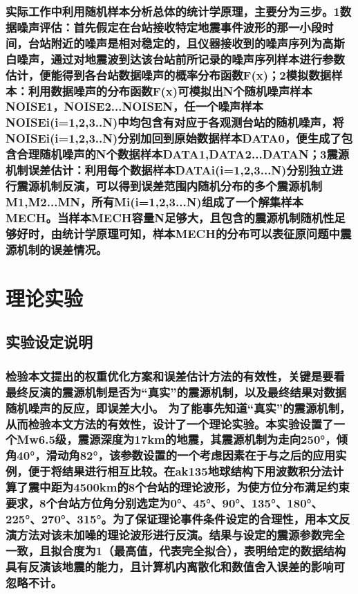 \documentclass[a4paper,12pt,single,pdftex]{scrartcl}
\begin{document}
\label{ID_880552050}\subsubsection{实际工作中利用随机样本分析总体的统计学原理，主要分为三步。1数据噪声评估：首先假定在台站接收特定地震事件波形的那一小段时间，台站附近的噪声是相对稳定的，且仪器接收到的噪声序列为高斯白噪声，通过对地震波到达该台站前所记录的噪声序列样本进行参数估计，便能得到各台站数据噪声的概率分布函数F(x)；2模拟数据样本：利用数据噪声的分布函数F(x)可模拟出N个随机噪声样本NOISE1，NOISE2...NOISEN，任一个噪声样本NOISEi(i=1,2,3..N)中均包含有对应于各观测台站的随机噪声，将NOISEi(i=1,2,3..N)分别加回到原始数据样本DATA0，便生成了包含合理随机噪声的N个数据样本DATA1,DATA2...DATAN；3震源机制误差估计：利用每个数据样本DATAi(i=1,2,3...N)分别独立进行震源机制反演，可以得到误差范围内随机分布的多个震源机制M1,M2...MN，所有Mi(i=1,2,3...N)组成了一个解集样本MECH。当样本MECH容量N足够大，且包含的震源机制随机性足够好时，由统计学原理可知，样本MECH的分布可以表征原问题中震源机制的误差情况。}

\label{ID_1164850097}\section{理论实验}

\label{ID_1307536851}\subsection{实验设定说明}

\label{ID_1980857973}\subsubsection{检验本文提出的权重优化方案和误差估计方法的有效性，关键是要看最终反演的震源机制是否为“真实”的震源机制，以及最终结果对数据随机噪声的反应，即误差大小。
为了能事先知道“真实”的震源机制，从而检验本文方法的有效性，设计了一个理论实验。本实验设置了一个Mw6.5级，震源深度为17km的地震，其震源机制为走向250°，倾角40°，滑动角82°，该参数设置的一个考虑因素在于与之后的应用实例，便于将结果进行相互比较。在ak135地球结构\citep{Kennett1995}下用波数积分法计算了震中距为4500km的8个台站的理论波形，为使方位分布满足约束要求，8个台站方位角分别选定为0°、45°、90°、135°、180°、225°、270°、315°。为了保证理论事件条件设定的合理性，用本文反演方法对该未加噪的理论波形进行反演。结果与设定的震源参数完全一致，且拟合度为1（最高值，代表完全拟合），表明给定的数据结构具有反演该地震的能力，且计算机内离散化和数值舍入误差的影响可忽略不计。}
\end{document}
